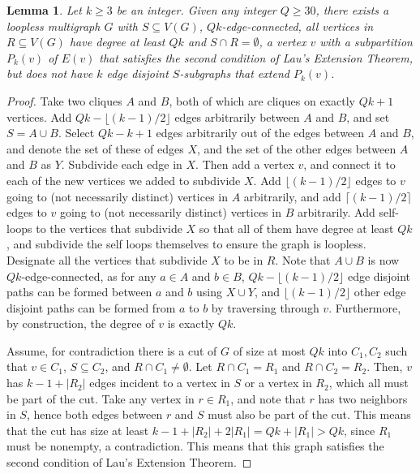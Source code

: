 \documentclass{article}
\newtheorem{lemma}{Lemma}[section]
\begin{document}
\begin{lemma}
    Let $k \geq 3$ be an integer. Given any integer $Q \geq 30$, there exists a loopless multigraph $G$ with $S \subseteq V(G)$, $Qk$-edge-connected, all vertices in $R \subseteq V(G)$ have degree at least $Qk$ and $S \cap R = \emptyset$, a vertex $v$ with a subpartition $P_k(v)$ of $E(v)$ that satisfies the second condition of Lau's Extension Theorem, but does not have $k$ edge disjoint $S$-subgraphs that extend $P_k(v)$. 
\end{lemma}

\begin{proof}
    Take two cliques $A$ and $B$, both of which are cliques on exactly $Qk+1$ vertices. Add $Qk-\lfloor (k-1)/2 \rfloor$ edges arbitrarily between $A$ and $B$, and set $S = A \cup B$. Select $Qk-k+1$ edges arbitrarily out of the edges between $A$ and $B$, and denote the set of these of edges $X$, and the set of the other edges between $A$ and $B$ as $Y$. Subdivide each edge in $X$. Then add a vertex $v$, and connect it to each of the new vertices we added to subdivide $X$. Add $\lfloor (k-1)/2 \rfloor$ edges to $v$ going to (not necessarily distinct) vertices in $A$ arbitrarily, and add $\lceil (k-1)/2 \rceil$ edges to $v$ going to (not necessarily distinct) vertices in $B$ arbitrarily. Add self-loops to the vertices that subdivide $X$ so that all of them have degree at least $Qk$, and subdivide the self loops themselves to ensure the graph is loopless. Designate all the vertices that subdivide $X$ to be in $R$. Note that $A \cup B$ is now $Qk$-edge-connected, as for any $a \in A$ and $b \in B$, $Qk-\lfloor (k-1)/2 \rfloor$ edge disjoint paths can be formed between $a$ and $b$ using $X \cup Y$, and $\lfloor (k-1)/2 \rfloor$ other edge disjoint paths can be formed from $a$ to $b$ by traversing through $v$. Furthermore, by construction, the degree of $v$ is exactly $Qk$. 

    Assume, for contradiction there is a cut of $G$ of size at most $Qk$ into $C_1,C_2$ such that $v \in C_1$, $S \subseteq C_2$, and $R \cap C_1 \not= \emptyset$. Let $R \cap C_1 = R_1$ and $R \cap C_2 = R_2$. Then, $v$ has $k-1+|R_2|$ edges incident to a vertex in $S$ or a vertex in $R_2$, which all must be part of the cut. Take any vertex in $r \in R_1$, and note that $r$ has two neighbors in $S$, hence both edges between $r$ and $S$ must also be part of the cut. This means that the cut has size at least $k-1+|R_2|+2|R_1| = Qk + |R_1| > Qk$, since $R_1$ must be nonempty, a contradiction. This means that this graph satisfies the second condition of Lau's Extension Theorem. 


\end{proof}
\end{document}
